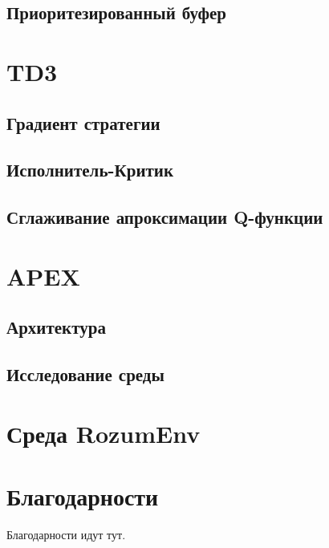 \documentclass{mipt-thesis-bs}
\begin{document}
\section{Приоритезированный буфер}


\chapter{TD3}
\section{Градиент стратегии}
\section{Исполнитель-Критик}
\section{Сглаживание апроксимации Q-функции}


\chapter{APEX}
\section{Архитектура}
\section{Исследование среды}

\chapter{Среда RozumEnv}


\backmatter


\chapter{Благодарности}

Благодарности идут тут.
\end{document}
